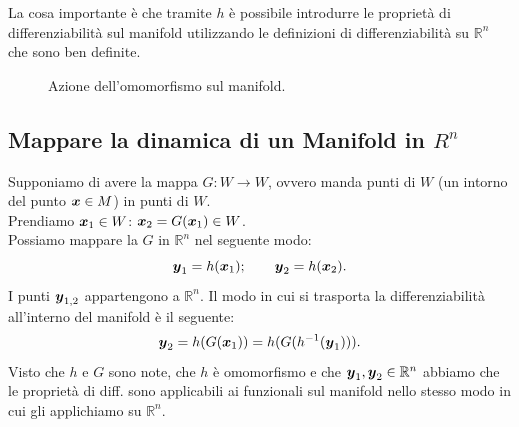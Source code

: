\noindent
La cosa importante è che tramite $h$ è possibile introdurre le proprietà di differenziabilità sul manifold utilizzando le definizioni di differenziabilità su $\mathbb{R}^n$ che sono ben definite.
\begin{figure}[H]
    \centering
    \caption{\scriptsize Azione dell'omomorfismo sul manifold.}
    \label{fig:3_2}
\end{figure}

\subsection{Mappare la dinamica di un Manifold in $R^n$}%
\label{sub:Mappare la dinamica di un Manifold in Rn }
Supponiamo di avere la mappa $G: W\to W$, ovvero manda punti di $W$ (un intorno del punto $\boldsymbol{x}  \in M$) in punti di $W$.\\
Prendiamo $\boldsymbol{x}_1 \in W$: $\boldsymbol{x}_2 = G(\boldsymbol{x}_1)\in W$.\\
Possiamo mappare la $G$ in $\mathbb{R}^n$ nel seguente modo:
\[
    \boldsymbol{y}_1 = h(\boldsymbol{x}_1); \qquad \boldsymbol{y}_2 = h(\boldsymbol{x}_2)
.\] 
I punti $\boldsymbol{y}_{1,2}$ appartengono a $\mathbb{R}^n$. Il modo in cui si trasporta la differenziabilità all'interno del manifold è il seguente:
\[
    \boldsymbol{y}_2 = h(G(\boldsymbol{x}_1)) = h(G(h^{-1}(\boldsymbol{y}_1)))
.\] 
Visto che $h$ e $G$ sono note, che $h$ è omomorfismo e che $\boldsymbol{y}_1, \boldsymbol{y}_2 \in \mathbb{R}^n$ abbiamo che le proprietà di diff. sono applicabili ai funzionali sul manifold nello stesso modo in cui gli applichiamo su $\mathbb{R}^n$.
